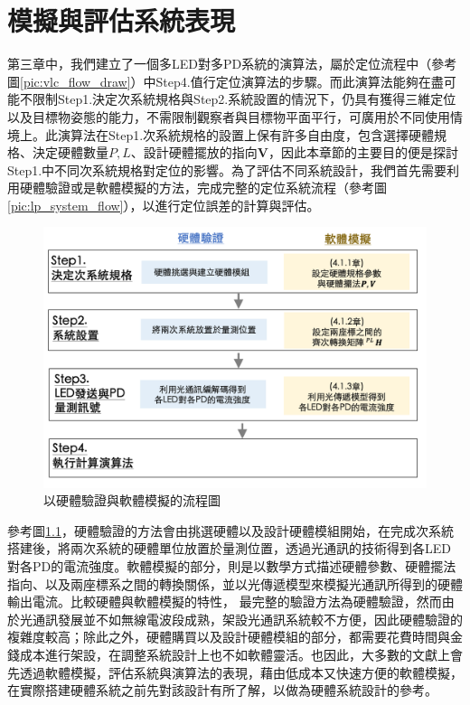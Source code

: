 \chapter{模擬與評估系統表現}
\label{chp:4}


第三章中，我們建立了一個多LED對多PD系統的演算法，屬於定位流程中（參考圖\ref{pic:vlc_flow_draw}）中Step4.值行定位演算法的步驟。而此演算法能夠在盡可能不限制Step1.決定次系統規格與Step2.系統設置的情況下，仍具有獲得三維定位以及目標物姿態的能力，不需限制觀察者與目標物平面平行，可廣用於不同使用情境上。此演算法在Step1.次系統規格的設置上保有許多自由度，包含選擇硬體規格、決定硬體數量$P,L$、設計硬體擺放的指向$\boldsymbol{V}$，因此本章節的主要目的便是探討Step1.中不同次系統規格對定位的影響。為了評估不同系統設計，我們首先需要利用硬體驗證或是軟體模擬的方法，完成完整的定位系統流程（參考圖\ref{pic:lp_system_flow}），以進行定位誤差的計算與評估。

\begin{figure}[htpb]
    \centering
    \includegraphics[width=15cm]{ch4pic/simulate_hardware.png}
    \caption{以硬體驗證與軟體模擬的流程圖}
    \label{pic:simulate_hardware}
\end{figure}

參考圖\ref{pic:simulate_hardware}，硬體驗證的方法會由挑選硬體以及設計硬體模組開始，在完成次系統搭建後，將兩次系統的硬體單位放置於量測位置，透過光通訊的技術得到各LED對各PD的電流強度。軟體模擬的部分，則是以數學方式描述硬體參數、硬體擺法指向、以及兩座標系之間的轉換關係，並以光傳遞模型來模擬光通訊所得到的硬體輸出電流。比較硬體與軟體模擬的特性， 最完整的驗證方法為硬體驗證，然而由於光通訊發展並不如無線電波段成熟，架設光通訊系統較不方便，因此硬體驗證的複雜度較高；除此之外，硬體購買以及設計硬體模組的部分，都需要花費時間與金錢成本進行架設，在調整系統設計上也不如軟體靈活。也因此，大多數的文獻上會先透過軟體模擬，評估系統與演算法的表現，藉由低成本又快速方便的軟體模擬，在實際搭建硬體系統之前先對該設計有所了解，以做為硬體系統設計的參考。

